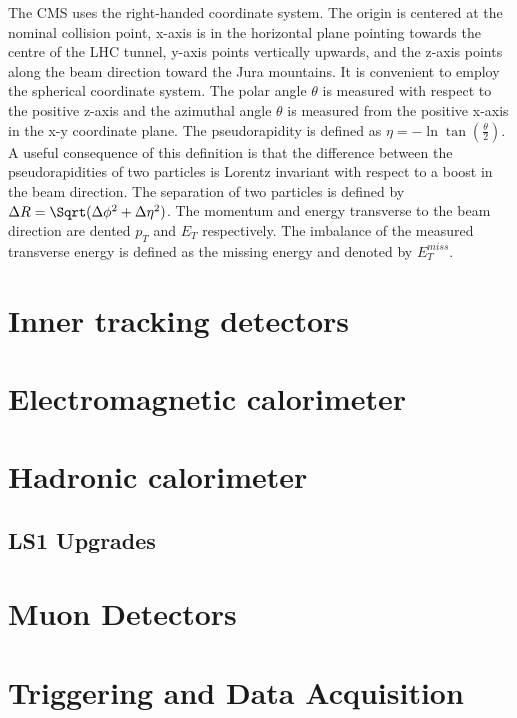 The CMS uses the right-handed coordinate system. The origin is centered at the nominal collision point, x-axis is in the horizontal plane pointing towards the centre of the LHC tunnel, y-axis points vertically upwards, and the z-axis points along the beam direction toward the Jura mountains. It is convenient to employ the spherical coordinate system. The polar angle  $\theta$ is measured with respect to the positive z-axis and the azimuthal angle $\theta$ is measured from the positive x-axis in the x-y coordinate plane. The pseudorapidity is defined as $\eta = -\ln \tan(\frac{\theta}{2})$.  A useful consequence of this definition is that the difference between the pseudorapidities of two particles is Lorentz invariant with respect to a boost in the beam direction. The separation of two particles is defined by $\Delta R = \Sqrt(\Delta \phi^2 + \Delta \eta^2)$. The momentum and energy transverse to the beam direction are dented $p_{T}$ and $E_{T}$ respectively. The imbalance of the measured transverse energy is defined as the missing energy and denoted by $E_{T}^{miss}$.     

\section{Inner tracking detectors}

\section{Electromagnetic calorimeter}

\section{Hadronic calorimeter}

\subsection{LS1 Upgrades}

\section{Muon Detectors}

\section{Triggering and Data Acquisition}
    




